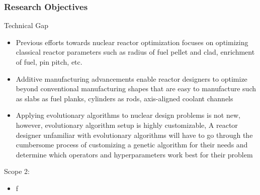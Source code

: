 \begin{frame}
    \frametitle{Research Objectives}
    \begin{block}{Technical Gap}
      \begin{itemize}
        \item Previous efforts towards nuclear reactor optimization focuses
        on optimizing classical reactor parameters such as radius of fuel pellet 
        and clad, enrichment of fuel, pin pitch, etc.
        \item Additive manufacturing advancements enable reactor designers to 
        optimize beyond conventional manufacturing shapes that are easy to 
        manufacture such as slabs as fuel planks, cylinders as rods, axis-aligned
        coolant channels 
        \item Applying evolutionary algorithms to nuclear design problems is not new,
        however, evolutionary algorithm setup is highly customizable, A reactor 
        designer unfamiliar with evolutionary algorithms will have to go through 
        the cumbersome process of customizing a genetic algorithm for their
        needs and determine which operators and hyperparameters work best for their problem
      \end{itemize}
    \end{block}
    \begin{block}{Scope 2: }
      \begin{itemize}
        \item f
        \end{itemize}
    \end{block}
  \end{frame}